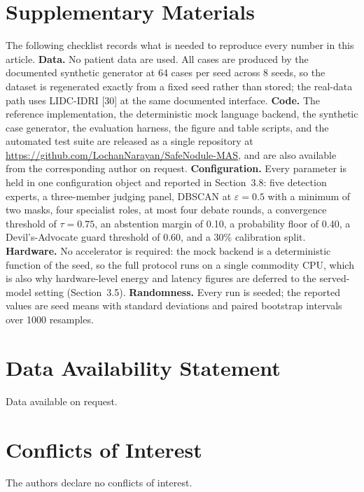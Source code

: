 \documentclass[12pt]{article}
\begin{document}
\section*{Supplementary Materials}

The following checklist records what is needed to reproduce every number in this article. \textbf{Data.} No patient data are used. All cases are produced by the documented synthetic generator at 64 cases per seed across 8 seeds, so the dataset is regenerated exactly from a fixed seed rather than stored; the real-data path uses LIDC-IDRI [30] at the same documented interface. \textbf{Code.} The reference implementation, the deterministic mock language backend, the synthetic case generator, the evaluation harness, the figure and table scripts, and the automated test suite are released as a single repository at \url{https://github.com/LochanNarayan/SafeNodule-MAS}, and are also available from the corresponding author on request. \textbf{Configuration.} Every parameter is held in one configuration object and reported in Section~3.8: five detection experts, a three-member judging panel, DBSCAN at $\varepsilon=0.5$ with a minimum of two masks, four specialist roles, at most four debate rounds, a convergence threshold of $\tau=0.75$, an abstention margin of 0.10, a probability floor of 0.40, a Devil's-Advocate guard threshold of 0.60, and a 30\% calibration split. \textbf{Hardware.} No accelerator is required: the mock backend is a deterministic function of the seed, so the full protocol runs on a single commodity CPU, which is also why hardware-level energy and latency figures are deferred to the served-model setting (Section~3.5). \textbf{Randomness.} Every run is seeded; the reported values are seed means with standard deviations and paired bootstrap intervals over 1000 resamples.

\section*{Data Availability Statement}

Data available on request.

\section*{Conflicts of Interest}

The authors declare no conflicts of interest.
\end{document}
